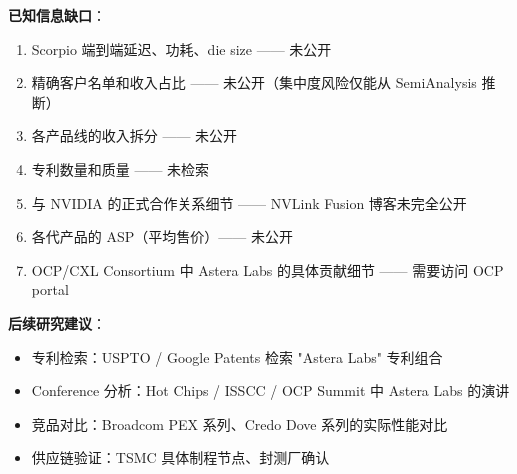 \documentclass[11pt,a4paper]{ctexart}
\begin{document}
\textbf{已知信息缺口}：
\begin{enumerate}
    \item Scorpio 端到端延迟、功耗、die size —— 未公开
    \item 精确客户名单和收入占比 —— 未公开（集中度风险仅能从 SemiAnalysis 推断）
    \item 各产品线的收入拆分 —— 未公开
    \item 专利数量和质量 —— 未检索
    \item 与 NVIDIA 的正式合作关系细节 —— NVLink Fusion 博客未完全公开
    \item 各代产品的 ASP（平均售价）—— 未公开
    \item OCP/CXL Consortium 中 Astera Labs 的具体贡献细节 —— 需要访问 OCP portal
\end{enumerate}

\textbf{后续研究建议}：
\begin{itemize}
    \item 专利检索：USPTO / Google Patents 检索 "Astera Labs" 专利组合
    \item Conference 分析：Hot Chips / ISSCC / OCP Summit 中 Astera Labs 的演讲
    \item 竞品对比：Broadcom PEX 系列、Credo Dove 系列的实际性能对比
    \item 供应链验证：TSMC 具体制程节点、封测厂确认
\end{itemize}
\end{document}
